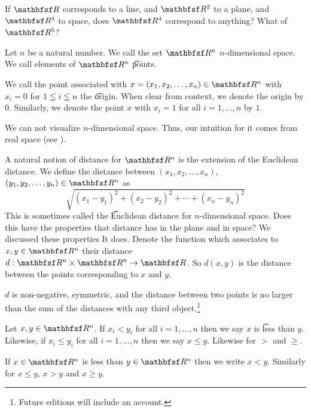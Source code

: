 

If $\R$ corresponds to a line, and $\R^2$ to a plane, and $\R^3$ to space, does $\R^4$ correspond to anything? What of $\R^5$?


Let $n$ be a natural number.
We call the set $\R^n$ \t{$n$-dimensional space}.
We call elements of $\R^n$ \t{points}.

We call the point associated with $x = (x_1, x_2, \dots, x_n) \in \R^n$ with $x_i = 0$ for $1 \leqq i \leqq n$ the \t{origin}.
When clear from context, we denote the origin by $0$.
Similarly, we denote the point $x$ with $x_i = 1$ for all $i = 1, \dots, n$ by $1$.


We can not visualize $n$-dimensional space.
Thus, our intuition for it comes from real space (see ).


A natural notion of distance for $\R^n$ is the extension of the Euclidean distance. We define the distance between $(x_1, x_2, \dots, x_n)$, $(y_1, y_2, \dots, y_n) \in \R^n$ as
\[
  \sqrt{(x_1 - y_1)^2 + (x_2 - y_2)^2 + \cdots + (x_n - y_n)^2}
\]
This is sometimes called the \t{Euclidean distance for $n$-dimensional space}.
Does this have the properties that distance has in the plane and in space?
We discussed these properties
It does.
Denote the function which associates to $x, y \in \R^n$ their distance $d: \R^n \times \R^n \to \R$.
So $d(x, y)$ is the distance between the points corresponding to $x$ and $y$.
\begin{proposition}
  $d$ is non-negative, symmetric, and the distance between two points is no larger than the sum of the distances with any third object.\footnote{Future editions will include an account.}
\end{proposition}


Let $x, y \in \R^n$.
If $x_i < y_i$ for all $i = 1, \dots, n$ then we say $x$ is \t{less than} $y$.
Likewise, if $x_i \leq y_i$ for all $i = 1, \dots, n$ then we say $x \leq y$.
Likewise for $>$ and $\geq$.


If $x \in \R^n$ is less than $y \in \R^n$  then we write $x < y$.
Similarly for $x \leq y$, $x > y$ and $x \geq y$.

